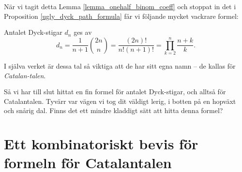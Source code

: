 \documentclass{tufte-handout}
\begin{document}
När vi tagit detta Lemma \ref{lemma_onehalf_binom_coeff} och stoppat in det i Proposition \ref{ugly_dyck_path_formula} får vi följande mycket vackrare formel:

\begin{theorem}\label{theorem_dyck_paths_counted_by_catalan}
    Antalet Dyck-stigar $d_n$ ges av
    $$d_n = \frac{1}{n + 1}\binom{2n}{n} = \dfrac{(2n)!}{n!(n+1)!} = \prod_{k=2}^{n}\dfrac{n+k}{k}.$$

    I själva verket är dessa tal så viktiga att de har sitt egna namn -- de kallas för \emph{Catalan-talen}.
\end{theorem}

Så vi har till slut hittat en fin formel för antalet Dyck-stigar, och alltså för Catalantalen. Tyvärr var vägen vi tog dit väldigt lerig, i botten på en hopväxt och snårig dal. Finns det ett mindre kladdigt sätt att hitta denna formel?

\section{Ett kombinatoriskt bevis för formeln för Catalantalen}
\end{document}
